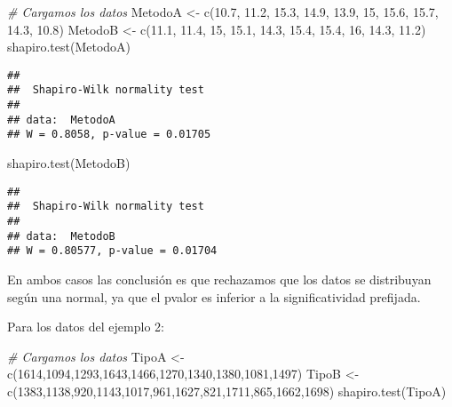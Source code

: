 \documentclass[
]{book}
\newenvironment{Shaded}{\begin{snugshade}}{\end{snugshade}}
\newcommand{\CommentTok}[1]{\textcolor[rgb]{0.56,0.35,0.01}{\textit{#1}}}
\newcommand{\DecValTok}[1]{\textcolor[rgb]{0.00,0.00,0.81}{#1}}
\newcommand{\FloatTok}[1]{\textcolor[rgb]{0.00,0.00,0.81}{#1}}
\newcommand{\FunctionTok}[1]{\textcolor[rgb]{0.00,0.00,0.00}{#1}}
\newcommand{\NormalTok}[1]{#1}
\newcommand{\OtherTok}[1]{\textcolor[rgb]{0.56,0.35,0.01}{#1}}
\begin{document}
\begin{Shaded}
\begin{Highlighting}[]
\CommentTok{\# Cargamos los datos}
\NormalTok{MetodoA }\OtherTok{\textless{}{-}} \FunctionTok{c}\NormalTok{(}\FloatTok{10.7}\NormalTok{, }\FloatTok{11.2}\NormalTok{, }\FloatTok{15.3}\NormalTok{, }\FloatTok{14.9}\NormalTok{, }\FloatTok{13.9}\NormalTok{, }\DecValTok{15}\NormalTok{, }\FloatTok{15.6}\NormalTok{, }\FloatTok{15.7}\NormalTok{, }\FloatTok{14.3}\NormalTok{, }\FloatTok{10.8}\NormalTok{)}
\NormalTok{MetodoB }\OtherTok{\textless{}{-}} \FunctionTok{c}\NormalTok{(}\FloatTok{11.1}\NormalTok{, }\FloatTok{11.4}\NormalTok{, }\DecValTok{15}\NormalTok{, }\FloatTok{15.1}\NormalTok{, }\FloatTok{14.3}\NormalTok{, }\FloatTok{15.4}\NormalTok{, }\FloatTok{15.4}\NormalTok{, }\DecValTok{16}\NormalTok{, }\FloatTok{14.3}\NormalTok{, }\FloatTok{11.2}\NormalTok{)}
\FunctionTok{shapiro.test}\NormalTok{(MetodoA)}
\end{Highlighting}
\end{Shaded}

\begin{verbatim}
## 
##  Shapiro-Wilk normality test
## 
## data:  MetodoA
## W = 0.8058, p-value = 0.01705
\end{verbatim}

\begin{Shaded}
\begin{Highlighting}[]
\FunctionTok{shapiro.test}\NormalTok{(MetodoB)}
\end{Highlighting}
\end{Shaded}

\begin{verbatim}
## 
##  Shapiro-Wilk normality test
## 
## data:  MetodoB
## W = 0.80577, p-value = 0.01704
\end{verbatim}

En ambos casos las conclusión es que rechazamos que los datos se distribuyan según una normal, ya que el pvalor es inferior a la significatividad prefijada.

Para los datos del ejemplo 2:

\begin{Shaded}
\begin{Highlighting}[]
\CommentTok{\# Cargamos los datos}
\NormalTok{TipoA }\OtherTok{\textless{}{-}} \FunctionTok{c}\NormalTok{(}\DecValTok{1614}\NormalTok{,}\DecValTok{1094}\NormalTok{,}\DecValTok{1293}\NormalTok{,}\DecValTok{1643}\NormalTok{,}\DecValTok{1466}\NormalTok{,}\DecValTok{1270}\NormalTok{,}\DecValTok{1340}\NormalTok{,}\DecValTok{1380}\NormalTok{,}\DecValTok{1081}\NormalTok{,}\DecValTok{1497}\NormalTok{)}
\NormalTok{TipoB }\OtherTok{\textless{}{-}} \FunctionTok{c}\NormalTok{(}\DecValTok{1383}\NormalTok{,}\DecValTok{1138}\NormalTok{,}\DecValTok{920}\NormalTok{,}\DecValTok{1143}\NormalTok{,}\DecValTok{1017}\NormalTok{,}\DecValTok{961}\NormalTok{,}\DecValTok{1627}\NormalTok{,}\DecValTok{821}\NormalTok{,}\DecValTok{1711}\NormalTok{,}\DecValTok{865}\NormalTok{,}\DecValTok{1662}\NormalTok{,}\DecValTok{1698}\NormalTok{)}
\FunctionTok{shapiro.test}\NormalTok{(TipoA)}
\end{Highlighting}
\end{Shaded}
\end{document}
